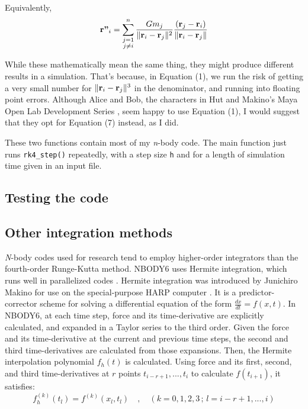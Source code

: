\documentclass{article}
\DeclarePairedDelimiter{\norm}{\lVert}{\rVert}
\begin{document}
Equivalently,
\begin{equation}
    \textbf{r''}_i = \sum_{\substack{j=1\\j\neq i}}^n \frac{Gm_j}{\norm{\textbf{r}_i-\textbf{r}_j}^2}\frac{(\textbf{r}_j-\textbf{r}_i)}{\norm{\textbf{r}_i-\textbf{r}_j}}
\end{equation}

While these mathematically mean the same thing, they might produce different results in a simulation. That's because, in Equation (1), we run the risk of getting a very small number for $\norm{\textbf{r}_i-\textbf{r}_j}^3$ in the denominator, and running into floating point errors. Although Alice and Bob, the characters in Hut and Makino's Maya Open Lab Development Series \cite{hut2007art}, seem happy to use Equation (1), I would suggest that they opt for Equation (7) instead, as I did.

These two functions contain most of my \textit{n}-body code. The main function just runs \colorbox{g}{\lstinline[basicstyle=\ttfamily\footnotesize\color{black}]|rk4_step()|} repeatedly, with a step size \colorbox{g}{\lstinline[basicstyle=\ttfamily\footnotesize\color{black}]|h|} and for a length of simulation time given in an input file.


\subsection{Testing the code}

\subsection{Other integration methods}

\textit{N}-body codes used for research tend to employ higher-order integrators than the fourth-order Runge-Kutta method. NBODY6 uses Hermite integration, which runs well in parallelized codes \cite{aarseth1999nbody1}. Hermite integration was introduced by Junichiro Makino for use on the special-purpose HARP computer \cite{makino1991optimal}. It is a predictor-corrector scheme for solving a differential equation of the form $\frac{dx}{dt}=f(x,t)$. In NBODY6, at each time step, force and its time-derivative are explicitly calculated, and expanded in a Taylor series to the third order. Given the force and its time-derivative at the current and previous time steps, the second and third time-derivatives are calculated from those expansions. Then, the Hermite interpolation polynomial $f_h(t)$ is calculated. Using force and its first, second, and third time-derivatives at $r$ points $t_{i-r+1},...,t_i$ to calculate $f(t_{i+1})$, it satisfies:
\begin{equation}
f^{(k)}_h(t_l) = f^{(k)}(x_l,t_l) \quad,\quad (k=0,1,2,3\,;\,l=i-r+1,...,i)
\end{equation}
\end{document}
